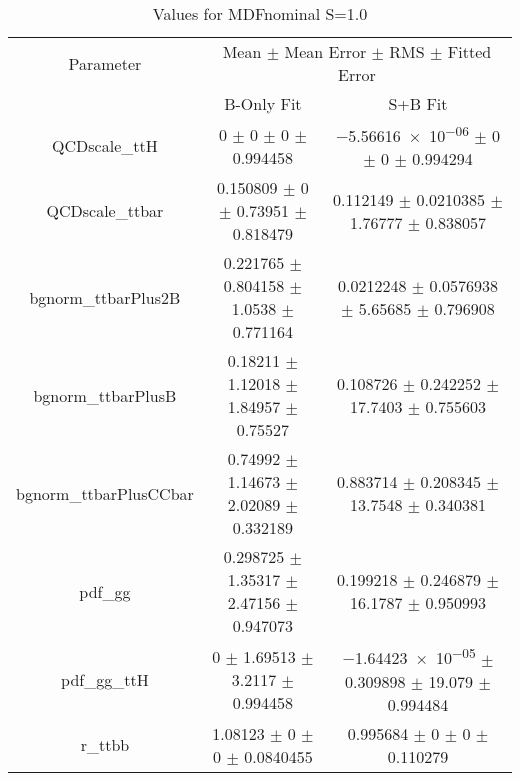 \begin{table}
\centering
\caption{Values for MDFnominal S=1.0}
\begin{tabular}{ccc}
\toprule
Parameter & \multicolumn{2}{c}{Mean $\pm$ Mean Error $\pm$ RMS $\pm$ Fitted Error}\\
 & B-Only Fit & S+B Fit\\
\midrule
QCDscale\_ttH & \num{0} $\pm$ \num{0} $\pm$ \num{0} $\pm$ \num{0.994458} & \num{-5.56616e-06} $\pm$ \num{0} $\pm$ \num{0} $\pm$ \num{0.994294}\\
QCDscale\_ttbar & \num{0.150809} $\pm$ \num{0} $\pm$ \num{0.73951} $\pm$ \num{0.818479} & \num{0.112149} $\pm$ \num{0.0210385} $\pm$ \num{1.76777} $\pm$ \num{0.838057}\\
bgnorm\_ttbarPlus2B & \num{0.221765} $\pm$ \num{0.804158} $\pm$ \num{1.0538} $\pm$ \num{0.771164} & \num{0.0212248} $\pm$ \num{0.0576938} $\pm$ \num{5.65685} $\pm$ \num{0.796908}\\
bgnorm\_ttbarPlusB & \num{0.18211} $\pm$ \num{1.12018} $\pm$ \num{1.84957} $\pm$ \num{0.75527} & \num{0.108726} $\pm$ \num{0.242252} $\pm$ \num{17.7403} $\pm$ \num{0.755603}\\
bgnorm\_ttbarPlusCCbar & \num{0.74992} $\pm$ \num{1.14673} $\pm$ \num{2.02089} $\pm$ \num{0.332189} & \num{0.883714} $\pm$ \num{0.208345} $\pm$ \num{13.7548} $\pm$ \num{0.340381}\\
pdf\_gg & \num{0.298725} $\pm$ \num{1.35317} $\pm$ \num{2.47156} $\pm$ \num{0.947073} & \num{0.199218} $\pm$ \num{0.246879} $\pm$ \num{16.1787} $\pm$ \num{0.950993}\\
pdf\_gg\_ttH & \num{0} $\pm$ \num{1.69513} $\pm$ \num{3.2117} $\pm$ \num{0.994458} & \num{-1.64423e-05} $\pm$ \num{0.309898} $\pm$ \num{19.079} $\pm$ \num{0.994484}\\
r\_ttbb & \num{1.08123} $\pm$ \num{0} $\pm$ \num{0} $\pm$ \num{0.0840455} & \num{0.995684} $\pm$ \num{0} $\pm$ \num{0} $\pm$ \num{0.110279}\\
\bottomrule
\end{tabular}
\end{table}